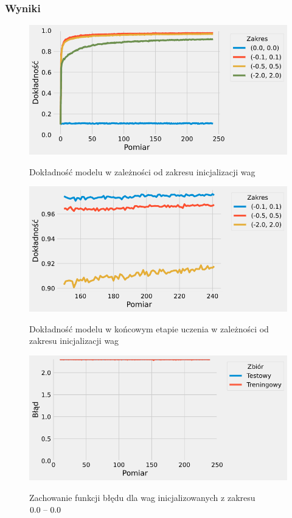 \documentclass{article}
\begin{document}
\subsubsection*{Wyniki}
\begin{figure}[H]
	\centering
	\caption{Dokładność modelu w zależności od zakresu inicjalizacji wag}
	\includegraphics[width=\textwidth]{w_acc.png}
	\label{fig:res31}
\end{figure}
\begin{figure}[H]
	\centering
	\caption{Dokładność modelu w końcowym etapie uczenia w zależności od zakresu inicjalizacji wag}
	\includegraphics[width=\textwidth]{w_acc_zoom.png}
	\label{fig:res32}
\end{figure}
\begin{figure}[H]
	\centering
	\caption{Zachowanie funkcji błędu dla wag inicjalizowanych z zakresu \($0.0 -- 0.0$\)}
	\includegraphics[width=\textwidth]{w_err_0.png}
	\label{fig:res33}
\end{figure}
\end{document}
